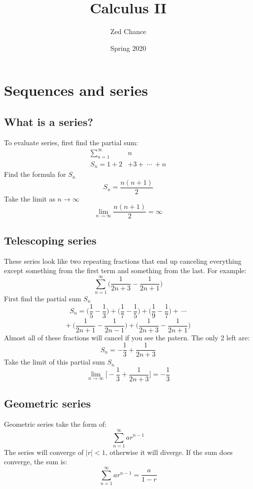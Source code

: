 \documentclass{report}
\title{Calculus II}
\date{Spring 2020}
\author{Zed Chance}
\begin{document}
\maketitle
\tableofcontents
\newpage

\chapter{Sequences and series}

\section{What is a series?}
    To evaluate series, first find the partial sum:
    \begin{align*}
        \sum_{n=1}^\infty & n \\
        S_n = 1 +  2 & + 3 +\  \cdots \  + n
    \end{align*}
    Find the formula for \(S_n\)
    \[S_n= \frac{n(n+1)}{2}\]
    Take the limit as \(n \rightarrow \infty\)
    \[\lim_{n \rightarrow \infty} \frac{n(n+1)}{2} = \infty\]

\section{Telescoping series}
    These series look like two repeating fractions that end up canceling everything except something from the first term and something from the last. For example:
    \[\sum_{n=1}^{\infty} \Big (\frac{1}{2n+3} - \frac{1}{2n+1}\Big )\]
    First find the partial sum \(S_n\)
    \[S_n = \Big ( \frac{1}{5}-\frac{1}{3}\Big ) + \Big ( \frac{1}{7}-\frac{1}{5}\Big ) + \Big ( \frac{1}{9}-\frac{1}{7}\Big ) + \ \cdots \]
    \[+\ \Big ( \frac{1}{2n+1}-\frac{1}{2n-1}\Big ) + \Big ( \frac{1}{2n+3}-\frac{1}{2n+1}\Big )\]
    Almost all of these fractions will cancel if you see the patern. The only 2 left are:
    \[S_n = - \frac{1}{3} + \frac{1}{2n+3}\]
    Take the limit of this partial sum \(S_n\)
    \[\lim_{n \rightarrow \infty}\big[ - \frac{1}{3} + \frac{1}{2n+3} \big] = - \frac{1}{3}\]

\section{Geometric series}
    Geometric series take the form of:
    \[\sum_{n=1}^\infty ar^{n-1}\]
    The series will converge of \(\big|r\big|< 1\), otherwise it will diverge.
    If the sum does converge, the sum is:
    \[\sum_{n=1}^\infty ar^{n-1} = \frac{a}{1-r}\]
\end{document}
